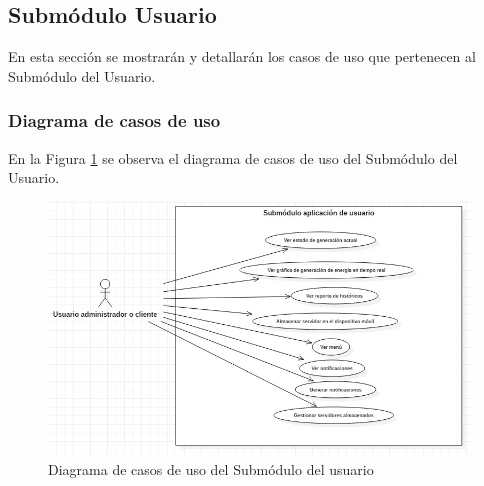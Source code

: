 \subsection{Submódulo Usuario}
En esta sección se mostrarán y detallarán los casos de uso que pertenecen al Submódulo del Usuario.
\subsubsection{Diagrama de casos de uso}
En la Figura \ref{fig:dcu-usuarios} se observa el diagrama de casos de uso del Submódulo del Usuario.
\begin{figure}[H]
	\centering
	\includegraphics[scale=.6]{Capitulo4/software/submodulos/images/dcuusuario.jpg}
	\caption{Diagrama de casos de uso del Submódulo del usuario}
	\label{fig:dcu-usuarios}
\end{figure}














